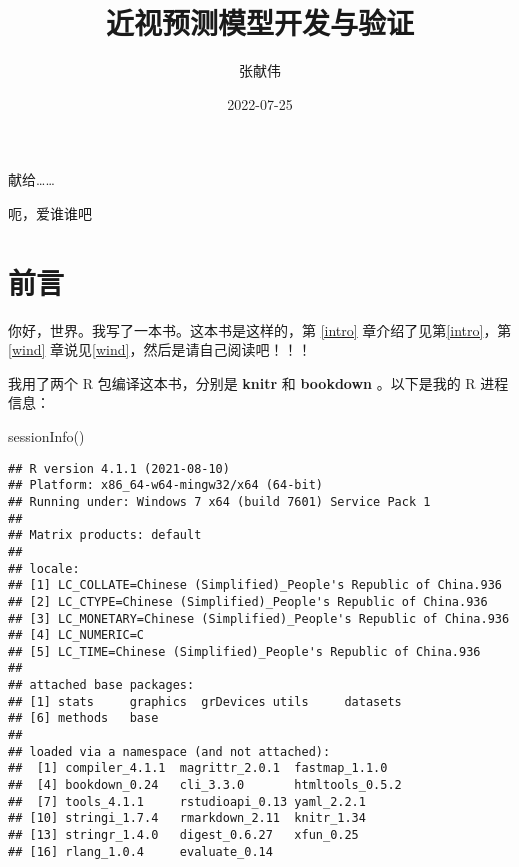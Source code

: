 \documentclass[]{ctexbook}
\title{近视预测模型开发与验证}
\author{张献伟}
\date{2022-07-25}
\newenvironment{Shaded}{\begin{snugshade}}{\end{snugshade}}
\newcommand{\FunctionTok}[1]{\textcolor[rgb]{0.00,0.00,0.00}{#1}}
\newcommand{\NormalTok}[1]{#1}
\begin{document}
\maketitle


\thispagestyle{empty}

\begin{center}
献给……

呃，爱谁谁吧
\end{center}

\setlength{\abovedisplayskip}{-5pt}
\setlength{\abovedisplayshortskip}{-5pt}

{
\setcounter{tocdepth}{2}
\tableofcontents
}
\listoftables
\listoffigures
\hypertarget{ux524dux8a00}{%
\chapter*{前言}\label{ux524dux8a00}}


你好，世界。我写了一本书。这本书是这样的，第 \ref{intro} 章介绍了见第\ref{intro}，第 \ref{wind} 章说见\ref{wind}，然后是请自己阅读吧！！！

我用了两个 R 包编译这本书，分别是 \textbf{knitr} \citep{xie2015} 和 \textbf{bookdown} \citep{R-bookdown}。以下是我的 R 进程信息：

\begin{Shaded}
\begin{Highlighting}[]
\FunctionTok{sessionInfo}\NormalTok{()}
\end{Highlighting}
\end{Shaded}

\begin{verbatim}
## R version 4.1.1 (2021-08-10)
## Platform: x86_64-w64-mingw32/x64 (64-bit)
## Running under: Windows 7 x64 (build 7601) Service Pack 1
## 
## Matrix products: default
## 
## locale:
## [1] LC_COLLATE=Chinese (Simplified)_People's Republic of China.936 
## [2] LC_CTYPE=Chinese (Simplified)_People's Republic of China.936   
## [3] LC_MONETARY=Chinese (Simplified)_People's Republic of China.936
## [4] LC_NUMERIC=C                                                   
## [5] LC_TIME=Chinese (Simplified)_People's Republic of China.936    
## 
## attached base packages:
## [1] stats     graphics  grDevices utils     datasets 
## [6] methods   base     
## 
## loaded via a namespace (and not attached):
##  [1] compiler_4.1.1  magrittr_2.0.1  fastmap_1.1.0  
##  [4] bookdown_0.24   cli_3.3.0       htmltools_0.5.2
##  [7] tools_4.1.1     rstudioapi_0.13 yaml_2.2.1     
## [10] stringi_1.7.4   rmarkdown_2.11  knitr_1.34     
## [13] stringr_1.4.0   digest_0.6.27   xfun_0.25      
## [16] rlang_1.0.4     evaluate_0.14
\end{verbatim}
\end{document}
